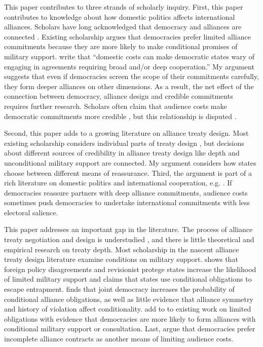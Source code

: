 \documentclass[12pt]{article}
\begin{document}
This paper contributes to three strands of scholarly inquiry.
First, this paper contributes to knowledge about how domestic politics affects international alliances. 
Scholars have long acknowledged that democracy and alliances are connected \citep{LaiReiter2000, GiblerWolford2006, Mattes2012, Warren2016, McManusYarhi-Milo2017}. 
Existing scholarship argues that democracies prefer limited alliance commitments \citep{Mattes2012, Chibaetal2015, FjelstulReiter2019} because they are more likely to make conditional promises of military support. 
\citet{Chibaetal2015} write that ``domestic costs can make democratic states wary of engaging in agreements requiring broad and/or deep cooperation.'' 
My argument suggests that even if democracies screen the scope of their commitments carefully, they form deeper alliances on other dimensions.  
As a result, the net effect of the connection between democracy, alliance design and credible commitments requires further research.
Scholars often claim that audience costs make democratic commitments more credible \citep{Gaubatz1996, Leedsetal2009, PotterBaum2014, DigiuseppePoast2016}, but this relationship is disputed \citep{GartzkeGleditsch2004, DownesSechser2012}. 


Second, this paper adds to a growing literature on alliance treaty design.  
Most existing scholarship considers individual parts of treaty design \citep{Benson2012, Mattes2012, Chibaetal2015}, but decisions about different sources of credibility in alliance treaty design like depth and unconditional military support are connected. 
My argument considers how states choose between different means of reassurance. 
Third, the argument is part of a rich literature on domestic politics and international cooperation, e.g. \citep{DownesRocke1995, Fearon1998, Leeds1999, MattesRodriguez2014}. 
If democracies reassure partners with deep alliance commitments, audience costs sometimes push democracies to undertake international commitments with less electoral salience. 


This paper addresses an important gap in the literature. 
The process of alliance treaty negotiation and design is understudied \citep{Poast2019a}, and there is little theoretical and empirical research on treaty depth. 
Most scholarship in the nascent alliance treaty design literature examine conditions on military support.
\citet{Benson2012} shows that foreign policy disagreements and revisionist protege states increase the likelihood of limited military support and \citet{Kim2011} claims that states use conditional obligations to escape entrapment. 
\citet{Mattes2012} finds that joint democracy increases the probability of conditional alliance obligations, as well as little evidence that alliance symmetry and history of violation affect conditionality. 
\citet{Chibaetal2015} add to to existing work on limited obligations with evidence that democracies are more likely to form alliances with conditional military support or consultation. 
Last, \citet{FjelstulReiter2019} argue that democracies prefer incomplete alliance contracts as another means of limiting audience costs. 
\end{document}
